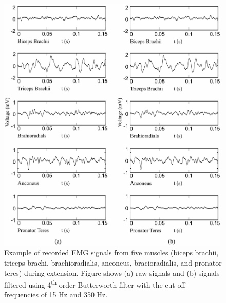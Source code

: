 \begin{figure}[ht]
\centering
\includegraphics[width=0.99\textwidth]{Images/figure3_B3.png}
\caption{Example of recorded EMG signals from five muscles (biceps brachii, triceps brachi, brachioradialis, anconeus, bracioradialis, and pronator teres) during extension. Figure shows (a) raw signals and (b) signals filtered using 4\textsuperscript{th} order Butterworth filter with the cut-off frequencies of 15 Hz and 350 Hz.}
\label{fig:3-B3}
\end{figure}   

